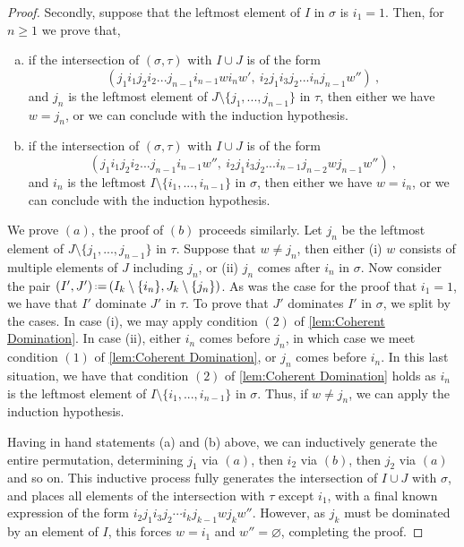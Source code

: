 \documentclass{amsart}
\theoremstyle{definition}
\newcommand{\eqdef}{\mbox{\,\raisebox{0.2ex}{\scriptsize\ensuremath{\mathrm:}}\ensuremath{=}\,}} %
\begin{document}
\begin{proof}
Secondly, suppose that the leftmost element of $I$ in $\sigma$ is $i_1=1$.
Then, for $n\geq1$ we prove that,
\begin{enumerate}[(a)]
    \item if the intersection of $(\sigma,\tau)$ with $I \cup J$ is of the form $$(j_1 i_1 j_2 i_2 ... j_{n-1} i_{n-1} w i_{n} w', \ i_2 j_1 i_3 j_2 ... i_{n}j_{n-1}w'') \ , $$ and $j_n$ is the leftmost element of $J\setminus \{j_1,...,j_{n-1}\}$ in $\tau$, then either we have $w = j_n$, or we can conclude with the induction hypothesis.
    \item if the intersection of $(\sigma,\tau)$ with $I \cup J$ is of the form $$(j_1 i_1 j_2 i_2 ... j_{n-1} i_{n-1} w'', \ i_2 j_1 i_3 j_2 ... i_{n-1}j_{n-2} w j_{n-1} w'') \ , $$ and $i_n$ is the leftmost $I\setminus \{i_1,...,i_{n-1}\}$ in $\sigma$, then either we have $w = i_n$, or we can conclude with the induction hypothesis.
\end{enumerate}
We prove $(a)$, the proof of $(b)$ proceeds similarly. 
Let $j_n$ be the leftmost element of $J\setminus \{j_1,...,j_{n-1} \}$ in $\tau$.
Suppose that $w\neq j_n$, then either (i) $w$ consists of multiple elements of $J$ including $j_n$, or (ii) $j_n$ comes after $i_n$ in $\sigma$.
Now consider the pair $(I',J') \eqdef (I_k\setminus \{i_n\}, J_k \setminus \{j_n\})$.
As was the case for the proof that $i_1=1$, we have that $I'$ dominate $J'$ in $\tau$.
To prove that $J'$ dominates $I'$ in $\sigma$, we split by the cases.
In case (i), we may apply condition $(2)$ of \cref{lem:Coherent Domination}.
In case (ii), either $i_n$ comes before $j_n$, in which case we meet condition $(1)$ of \cref{lem:Coherent Domination}, or $j_n$ comes before $i_n$.
In this last situation, we have that condition $(2)$ of \cref{lem:Coherent Domination} holds as $i_n$ is the leftmost element of $I\setminus \{i_1,...,i_{n-1} \}$ in $\sigma$.
Thus, if $w \neq j_n$, we can apply the induction hypothesis. 

Having in hand statements (a) and (b) above, we can inductively generate the entire permutation, determining $j_1$ via $(a)$, then $i_2$ via $(b)$, then $j_2$ via $(a)$ and so on.
This inductive process fully generates the intersection of $I\cup J$ with $\sigma$, and places all elements of the intersection with $\tau$ except $i_1$, with a final known expression of the form $i_2 j_1 i_3 j_2 \cdots i_k j_{k-1} w j_k w''$.
However, as $j_k$ must be dominated by an element of $I$, this forces $w = i_1$ and $w'' =\varnothing$, completing the proof.
\end{proof}
\end{document}
